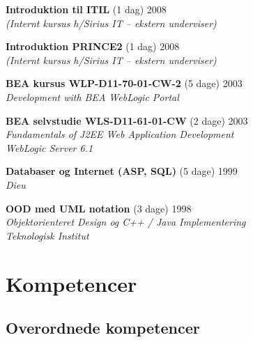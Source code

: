 \documentclass[a4paper,11pt]{article}
\begin{document}
\textbf{Introduktion til ITIL} \hfill (1 dag) 2008 \\
\textsl{(Internt kursus h/Sirius IT -- ekstern underviser)}

\textbf{Introduktion PRINCE2} \hfill (1 dag) 2008 \\
\textsl{(Internt kursus h/Sirius IT -- ekstern underviser)}

\textbf{BEA kursus WLP-D11-70-01-CW-2} \hfill (5 dage) 2003 \\
\textsl{Development with BEA WebLogic Portal}

\textbf{BEA selvstudie WLS-D11-61-01-CW} \hfill (2 dage) 2003 \\
\textsl{Fundamentals of J2EE Web Application Development\\WebLogic Server 6.1}


\textbf{Databaser og Internet (ASP, SQL)} \hfill (5 dage) 1999 \\
\textsl{Dieu}

\textbf{OOD med UML notation} \hfill (3 dage) 1998 \\
\textsl{Objektorienteret Design og C++ / Java Implementering\\Teknologisk Institut}


\section*{Kompetencer}

\subsection*{Overordnede kompetencer}
\end{document}
